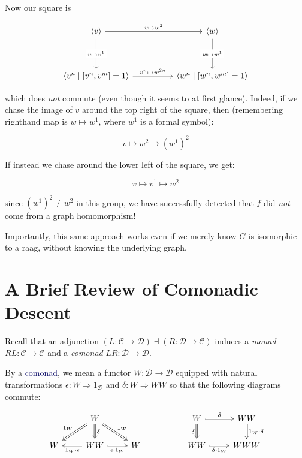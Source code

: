 \documentclass[12pt]{article}
\theoremstyle{definition}
\theoremstyle{theorem}
\newcommand*{\catVarFont}[1]{\mathcal{#1}}
\newcommand{\catC}{\catVarFont{C}}
\newcommand{\catD}{\catVarFont{D}}
\newcommand*{\important}[1]{\textcolor{MidnightBlue}{#1}}
\begin{document}
Now our square is

\[\begin{tikzcd}
	{\langle v \rangle} && {\langle w \rangle} \\
	\\
	{\langle v^n \mid [v^n,v^m] = 1 \rangle} && {\langle w^n \mid [w^n, w^m] = 1 \rangle}
	\arrow["{v \mapsto w^2}", from=1-1, to=1-3]
	\arrow["{v^n \mapsto w^{2n}}", from=3-1, to=3-3]
	\arrow["{v \mapsto v^1}"{description}, from=1-1, to=3-1]
	\arrow["{w \mapsto w^1}"{description}, from=1-3, to=3-3]
\end{tikzcd}\]

which does \emph{not} commute (even though it seems to at first glance). 
Indeed, if we chase the image of $v$ around the top right of the square, then
(remembering righthand map is $w \mapsto w^1$, where $w^1$ is a formal symbol):

\[ v \mapsto w^2 \mapsto (w^1)^2 \]

If instead we chase around the lower left of the square, we get:

\[ v \mapsto v^1 \mapsto w^2 \]

since $(w^1)^2 \neq w^2$ in this group, we have successfully detected that 
$f$ did \emph{not} come from a graph homomorphism!

Importantly, this same approach works even if we merely know $G$ is isomorphic
to a raag, without knowing the underlying graph.

\section{A Brief Review of Comonadic Descent}
\label{review}

Recall that an adjunction
$(L : \catC \to \catD) \dashv (R : \catD \to \catC)$
induces a \emph{monad} $RL : \catC \to \catC$ and a \emph{comonad}
$LR : \catD \to \catD$.

By a \important{comonad}, we mean a functor $W : \catD \to \catD$ equipped with natural
transformations $\epsilon : W \Rightarrow 1_\catD$ and $\delta : W \Rightarrow WW$
so that the following diagrams commute:

\[
    \begin{tikzcd}
    & W &&& W & WW \\
    W & WW & W && WW & WWW
    \arrow["{1_W \cdot \epsilon}", Rightarrow, from=2-2, to=2-1]
    \arrow["{\epsilon \cdot 1_W}"', Rightarrow, from=2-2, to=2-3]
    \arrow["\delta", Rightarrow, from=1-2, to=2-2]
    \arrow["{1_W}"', Rightarrow, from=1-2, to=2-1]
    \arrow["{1_W}", Rightarrow, from=1-2, to=2-3]
    \arrow["\delta"', Rightarrow, from=1-5, to=2-5]
    \arrow["\delta", Rightarrow, from=1-5, to=1-6]
    \arrow["{\delta \cdot 1_W}"', Rightarrow, from=2-5, to=2-6]
    \arrow["{1_W \cdot \delta}", Rightarrow, from=1-6, to=2-6]
    \end{tikzcd}
\]
\end{document}
